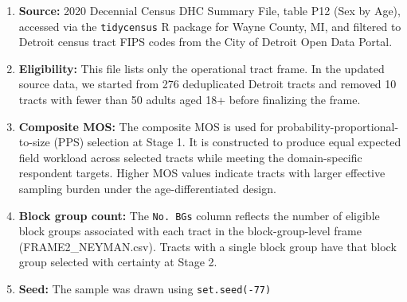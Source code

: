 \documentclass[
  11pt,
]{article}
\begin{document}
\begin{enumerate}
\def\labelenumi{\arabic{enumi}.}
\item
  \textbf{Source:} 2020 Decennial Census DHC Summary File, table P12
  (Sex by Age), accessed via the \texttt{tidycensus} R package for Wayne
  County, MI, and filtered to Detroit census tract FIPS codes from the
  City of Detroit Open Data Portal.
\item
  \textbf{Eligibility:} This file lists only the operational tract
  frame. In the updated source data, we started from 276 deduplicated
  Detroit tracts and removed 10 tracts with fewer than 50 adults aged
  18+ before finalizing the frame.
\item
  \textbf{Composite MOS:} The composite MOS is used for
  probability-proportional-to-size (PPS) selection at Stage 1. It is
  constructed to produce equal expected field workload across selected
  tracts while meeting the domain-specific respondent targets. Higher
  MOS values indicate tracts with larger effective sampling burden under
  the age-differentiated design.
\item
  \textbf{Block group count:} The \texttt{No.\ BGs} column reflects the
  number of eligible block groups associated with each tract in the
  block-group-level frame (FRAME2\_NEYMAN.csv). Tracts with a single
  block group have that block group selected with certainty at Stage 2.
\item
  \textbf{Seed:} The sample was drawn using \texttt{set.seed(-77)}
\end{enumerate}
\end{document}
